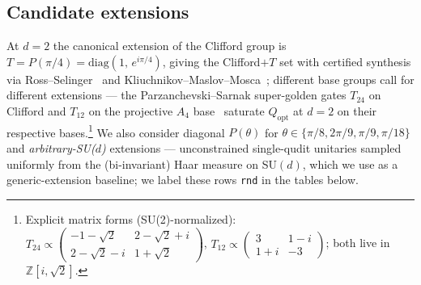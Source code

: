 \documentclass[twocolumn,superscriptaddress,showpacs,nofootinbib,notitlepage,preprintnumbers,secnumarabic,amssymb, nobibnotes, aps, prd]{revtex4-2}
\newcommand{\Popt}{Q_{\mathrm{opt}}} %
\begin{document}
\subsection{Candidate extensions}\label{sec:qco_candidates}

At $d=2$ the canonical extension of the Clifford group is $T = P(\pi/4) = \mathrm{diag}(1,\,e^{i\pi/4})$, giving the Clifford$+T$ set with certified synthesis via Ross--Selinger~\cite{Ross:2014kbr} and Kliuchnikov--Maslov--Mosca~\cite{Kliuchnikov:2012pla}; different base groups call for different extensions --- the Parzanchevski--Sarnak super-golden gates $T_{24}$ on Clifford and $T_{12}$ on the projective $A_4$ base~\cite{ParzanchevskiSarnak:2018} saturate $\Popt$ at $d=2$ on their respective bases.\footnote{Explicit matrix forms (\mbox{SU}(2)-normalized): $T_{24} \propto\left(\begin{smallmatrix}-1-\sqrt{2} & 2-\sqrt{2}+i \\ 2-\sqrt{2}-i & 1+\sqrt{2}\end{smallmatrix}\right)$, $T_{12} \propto\left(\begin{smallmatrix}3 & 1-i \\ 1+i & -3\end{smallmatrix}\right)$; both live in $\mathbb{Z}[i,\sqrt{2}]$.} We also consider diagonal $P(\theta)$ for $\theta \in \{\pi/8, 2\pi/9, \pi/9, \pi/18\}$ and \emph{arbitrary-SU($d$)} extensions --- unconstrained single-qudit unitaries sampled uniformly from the (bi-invariant) Haar measure on SU$(d)$, which we use as a generic-extension baseline; we label these rows \texttt{rnd} in the tables below.
\end{document}

